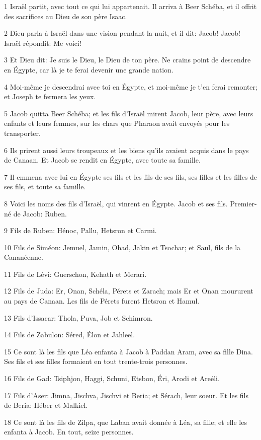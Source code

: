 \par 1 Israël partit, avec tout ce qui lui appartenait. Il arriva à Beer Schéba, et il offrit des sacrifices au Dieu de son père Isaac.
\par 2 Dieu parla à Israël dans une vision pendant la nuit, et il dit: Jacob! Jacob! Israël répondit: Me voici!
\par 3 Et Dieu dit: Je suis le Dieu, le Dieu de ton père. Ne crains point de descendre en Égypte, car là je te ferai devenir une grande nation.
\par 4 Moi-même je descendrai avec toi en Égypte, et moi-même je t'en ferai remonter; et Joseph te fermera les yeux.
\par 5 Jacob quitta Beer Schéba; et les fils d'Israël mirent Jacob, leur père, avec leurs enfants et leurs femmes, sur les chars que Pharaon avait envoyés pour les transporter.
\par 6 Ils prirent aussi leurs troupeaux et les biens qu'ils avaient acquis dans le pays de Canaan. Et Jacob se rendit en Égypte, avec toute sa famille.
\par 7 Il emmena avec lui en Égypte ses fils et les fils de ses fils, ses filles et les filles de ses fils, et toute sa famille.
\par 8 Voici les noms des fils d'Israël, qui vinrent en Égypte. Jacob et ses fils. Premier-né de Jacob: Ruben.
\par 9 Fils de Ruben: Hénoc, Pallu, Hetsron et Carmi.
\par 10 Fils de Siméon: Jemuel, Jamin, Ohad, Jakin et Tsochar; et Saul, fils de la Cananéenne.
\par 11 Fils de Lévi: Guerschon, Kehath et Merari.
\par 12 Fils de Juda: Er, Onan, Schéla, Pérets et Zarach; mais Er et Onan moururent au pays de Canaan. Les fils de Pérets furent Hetsron et Hamul.
\par 13 Fils d'Issacar: Thola, Puva, Job et Schimron.
\par 14 Fils de Zabulon: Séred, Élon et Jahleel.
\par 15 Ce sont là les fils que Léa enfanta à Jacob à Paddan Aram, avec sa fille Dina. Ses fils et ses filles formaient en tout trente-trois personnes.
\par 16 Fils de Gad: Tsiphjon, Haggi, Schuni, Etsbon, Éri, Arodi et Areéli.
\par 17 Fils d'Aser: Jimna, Jischva, Jischvi et Beria; et Sérach, leur soeur. Et les fils de Beria: Héber et Malkiel.
\par 18 Ce sont là les fils de Zilpa, que Laban avait donnée à Léa, sa fille; et elle les enfanta à Jacob. En tout, seize personnes.
